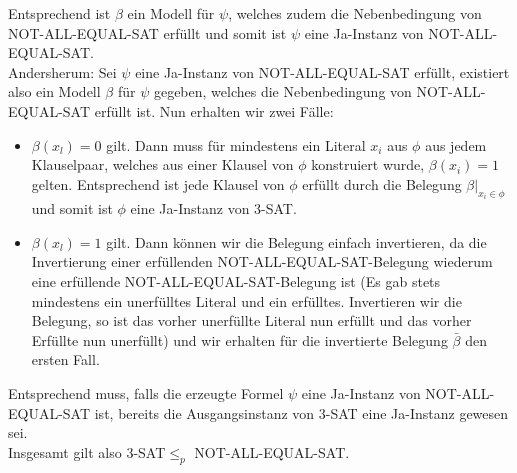 \documentclass{article}
\begin{document}
Entsprechend ist $\beta$ ein Modell für $\psi$, welches zudem die Nebenbedingung von NOT-ALL-EQUAL-SAT erfüllt und somit ist $\psi$ eine Ja-Instanz von NOT-ALL-EQUAL-SAT.\\


Andersherum: Sei $\psi$ eine Ja-Instanz von NOT-ALL-EQUAL-SAT erfüllt, existiert also ein Modell $\beta$ für $\psi$ gegeben, welches die Nebenbedingung von NOT-ALL-EQUAL-SAT erfüllt ist. Nun erhalten wir zwei Fälle:
\begin{itemize}
\item $\beta(x_l)=0$ gilt. Dann muss für mindestens ein Literal $x_i$ aus $\phi$ aus jedem Klauselpaar, welches aus einer Klausel von $\phi$ konstruiert wurde, $\beta(x_i)=1$ gelten. Entsprechend ist jede Klausel von $\phi$ erfüllt durch die Belegung $\beta |_{x_i \in \phi}$ und somit ist $\phi$ eine Ja-Instanz von 3-SAT.
\item $\beta(x_l)=1$ gilt. Dann können wir die Belegung einfach invertieren, da die Invertierung einer erfüllenden NOT-ALL-EQUAL-SAT-Belegung wiederum eine erfüllende NOT-ALL-EQUAL-SAT-Belegung ist (Es gab stets mindestens ein unerfülltes Literal und ein erfülltes. Invertieren wir die Belegung, so ist das vorher unerfüllte Literal nun erfüllt und das vorher Erfüllte nun unerfüllt) und wir erhalten für die invertierte Belegung $\bar{\beta}$ den ersten Fall. 
\end{itemize}

Entsprechend muss, falls die erzeugte Formel $\psi$ eine Ja-Instanz von NOT-ALL-EQUAL-SAT ist, bereits die Ausgangsinstanz von 3-SAT eine Ja-Instanz gewesen sei.\\

Insgesamt gilt also 3-SAT$\leq_p$ NOT-ALL-EQUAL-SAT.
\end{document}
